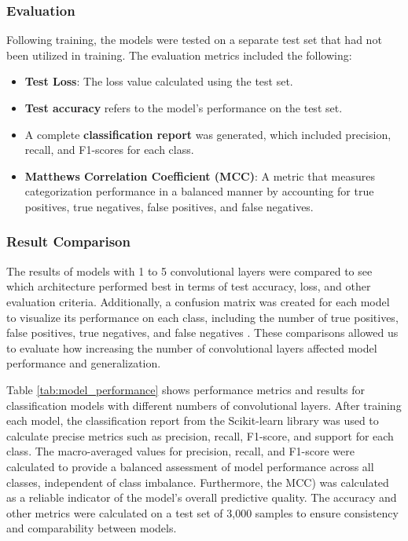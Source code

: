 \documentclass[conference]{IEEEtran}
\begin{document}
\subsubsection{Evaluation}
Following training, the models were tested on a separate test set that had not been utilized in training. The evaluation metrics included the following:
\begin{itemize}
    \item \textbf{Test Loss}: The loss value calculated using the test set. 
    
    \item \textbf{Test accuracy} refers to the model's performance on the test set.

    \item A complete \textbf{classification report} was generated, which included precision, recall, and F1-scores for each class.

    \item \textbf{Matthews Correlation Coefficient (MCC)}: A metric that measures categorization performance in a balanced manner by accounting for true positives, true negatives, false positives, and false negatives.
\end{itemize}


\subsubsection{Result Comparison}
The results of models with 1 to 5 convolutional layers were compared to see which architecture performed best in terms of test accuracy, loss, and other evaluation criteria. Additionally, a confusion matrix was created for each model to visualize its performance on each class, including the number of true positives, false positives, true negatives, and false negatives \cite{confmatrix}. These comparisons allowed us to evaluate how increasing the number of convolutional layers affected model performance and generalization.

Table \ref{tab:model_performance} shows performance metrics and results for classification models with different numbers of convolutional layers. After training each model, the classification report from the Scikit-learn library \cite{classreport} was used to calculate precise metrics such as precision, recall, F1-score, and support for each class. The macro-averaged values for precision, recall, and F1-score were calculated to provide a balanced assessment of model performance across all classes, independent of class imbalance. Furthermore, the \ac{MCC}) was calculated as a reliable indicator of the model's overall predictive quality. The accuracy and other metrics were calculated on a test set of 3,000 samples to ensure consistency and comparability between models.
\end{document}
